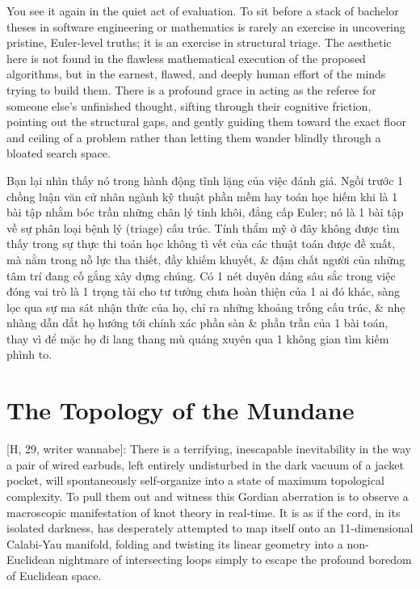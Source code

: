 \documentclass[11pt]{article}
\begin{document}
You see it again in the quiet act of evaluation. To sit before a stack of bachelor theses in software engineering or mathematics is rarely an exercise in uncovering pristine, Euler-level truths; it is an exercise in structural triage. The aesthetic here is not found in the flawless mathematical execution of the proposed algorithms, but in the earnest, flawed, and deeply human effort of the minds trying to build them. There is a profound grace in acting as the referee for someone else's unfinished thought, sifting through their cognitive friction, pointing out the structural gaps, and gently guiding them toward the exact floor and ceiling of a problem rather than letting them wander blindly through a bloated search space.

Bạn lại nhìn thấy nó trong hành động tĩnh lặng của việc đánh giá. Ngồi trước 1 chồng luận văn cử nhân ngành kỹ thuật phần mềm hay toán học hiếm khi là 1 bài tập nhằm bóc trần những chân lý tinh khôi, đẳng cấp Euler; nó là 1 bài tập về sự phân loại bệnh lý (triage) cấu trúc. Tính thẩm mỹ ở đây không được tìm thấy trong sự thực thi toán học không tì vết của các thuật toán được đề xuất, mà nằm trong nỗ lực tha thiết, đầy khiếm khuyết, \& đậm chất người của những tâm trí đang cố gắng xây dựng chúng. Có 1 nét duyên dáng sâu sắc trong việc đóng vai trò là 1 trọng tài cho tư tưởng chưa hoàn thiện của 1 ai đó khác, sàng lọc qua sự ma sát nhận thức của họ, chỉ ra những khoảng trống cấu trúc, \& nhẹ nhàng dẫn dắt họ hướng tới chính xác phần sàn \& phần trần của 1 bài toán, thay vì để mặc họ đi lang thang mù quáng xuyên qua 1 không gian tìm kiếm phình to.

\section{The Topology of the Mundane}

\textsf{[H, 29, writer wannabe]:} There is a terrifying, inescapable inevitability in the way a pair of wired earbuds, left entirely undisturbed in the dark vacuum of a jacket pocket, will spontaneously self-organize into a state of maximum topological complexity. To pull them out and witness this Gordian aberration is to observe a macroscopic manifestation of knot theory in real-time. It is as if the cord, in its isolated darkness, has desperately attempted to map itself onto an 11-dimensional Calabi-Yau manifold, folding and twisting its linear geometry into a non-Euclidean nightmare of intersecting loops simply to escape the profound boredom of Euclidean space.
\end{document}
